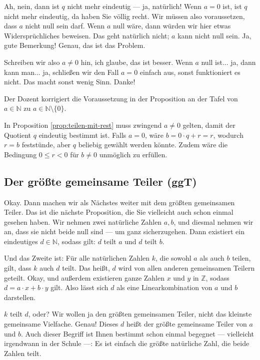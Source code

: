 \begin{spoken-clean}[00:13:40 - 00:15:20]
Ah, nein, dann ist $q$ nicht mehr eindeutig --- ja, natürlich! Wenn $a = 0$ ist, ist $q$ nicht mehr eindeutig, da haben Sie völlig recht. Wir müssen also voraussetzen, dass $a$ nicht null sein darf. Wenn $a$ null wäre, dann würden wir hier etwas Widersprüchliches beweisen. Das geht natürlich nicht; $a$ kann nicht null sein. Ja, gute Bemerkung! Genau, das ist das Problem.

Schreiben wir also $a \neq 0$ hin, ich glaube, das ist besser. Wenn $a$ null ist... ja, dann kann man... ja, schließen wir den Fall $a = 0$ einfach aus, sonst funktioniert es nicht. Das macht sonst wenig Sinn. Danke!
\end{spoken-clean}

\begin{meta-note}
Der Dozent korrigiert die Voraussetzung in der Proposition an der Tafel von $a \in \mathbb{N}$ zu $a \in \mathbb{N} \setminus \{0\}$.
\end{meta-note}

\begin{math-stroke}
In Proposition \ref{prop:teilen-mit-rest} muss zwingend $a \neq 0$ gelten, damit der Quotient $q$ eindeutig bestimmt ist. Falls $a = 0$, wäre $b = 0 \cdot q + r = r$, wodurch $r = b$ feststünde, aber $q$ beliebig gewählt werden könnte. Zudem wäre die Bedingung $0 \le r < 0$ für $b \neq 0$ unmöglich zu erfüllen.
\end{math-stroke}

\subsection{Der größte gemeinsame Teiler (ggT)}

\begin{spoken-clean}[00:15:20 - 00:17:50]
Okay. Dann machen wir als Nächstes weiter mit dem größten gemeinsamen Teiler. Das ist die nächste Proposition, die Sie vielleicht auch schon einmal gesehen haben. Wir nehmen zwei natürliche Zahlen $a, b$, und diesmal nehmen wir an, dass sie nicht beide null sind --- um ganz sicherzugehen. Dann existiert ein eindeutiges $d \in \mathbb{N}$, sodass gilt: $d$ teilt $a$ und $d$ teilt $b$.

Und das Zweite ist: Für alle natürlichen Zahlen $k$, die sowohl $a$ als auch $b$ teilen, gilt, dass $k$ auch $d$ teilt. Das heißt, $d$ wird von allen anderen gemeinsamen Teilern geteilt. Okay, und außerdem existieren ganze Zahlen $x$ und $y$ in $\mathbb{Z}$, sodass $d = a \cdot x + b \cdot y$ gilt. Also lässt sich $d$ als eine Linearkombination von $a$ und $b$ darstellen.

 $k$ teilt $d$, oder? Wir wollen ja den größten gemeinsamen Teiler, nicht das kleinste gemeinsame Vielfache. Genau! Dieses $d$ heißt der größte gemeinsame Teiler von $a$ und $b$. Auch dieser Begriff ist Ihnen bestimmt schon einmal begegnet --- vielleicht irgendwann in der Schule ---: Es ist einfach die größte natürliche Zahl, die beide Zahlen teilt.
\end{spoken-clean}


